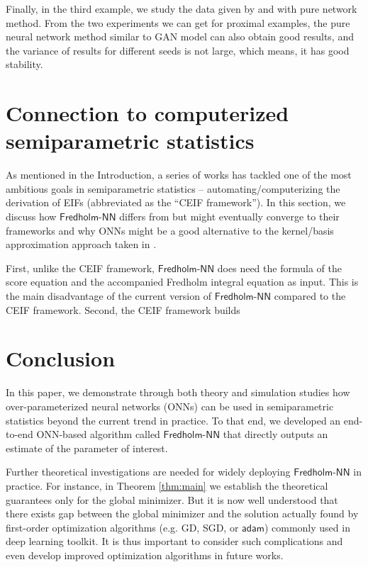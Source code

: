 \documentclass[11pt]{article}
\def\fred{\mathsf{Fredholm\mbox{-}NN}}
\begin{document}
Finally, in the third example, we study the data given by \cite{Benjaminproximal} and \cite{Afsanehproximal} with pure network method. From the two experiments we can get for proximal examples, the pure neural network method similar to GAN model can also obtain good results, and the variance of results for different seeds is not large, which means, it has good stability.


\section{Connection to computerized semiparametric statistics}
\label{sec:vdl}

As mentioned in the Introduction, a series of works \citep{frangakis2015deductive, carone2019toward, williamson2020unified} has tackled one of the most ambitious goals in semiparametric statistics -- automating/computerizing the derivation of EIFs (abbreviated as the ``CEIF framework''). In this section, we discuss how $\fred$ differs from but might eventually converge to their frameworks and why ONNs might be a good alternative to the kernel/basis approximation approach taken in \cite{carone2019toward}.

First, unlike the CEIF framework, $\fred$ does need the formula of the score equation and the accompanied Fredholm integral equation as input. This is the main disadvantage of the current version of $\fred$ compared to the CEIF framework. Second, the CEIF framework builds 

\section{Conclusion}
\label{sec:conclude}

In this paper, we demonstrate through both theory and simulation studies how over-parameterized neural networks (ONNs) can be used in semiparametric statistics beyond the current trend in practice. To that end, we developed an end-to-end ONN-based algorithm called $\fred$ that directly outputs an estimate of the parameter of interest. 

Further theoretical investigations are needed for widely deploying $\fred$ in practice. For instance, in Theorem \ref{thm:main} we establish the theoretical guarantees only for the global minimizer. But it is now well understood that there exists gap between the global minimizer and the solution actually found by first-order optimization algorithms (e.g. GD, SGD, or $\mathsf{adam}$) commonly used in deep learning toolkit. It is thus important to consider such complications and even develop improved optimization algorithms in future works.
\end{document}
